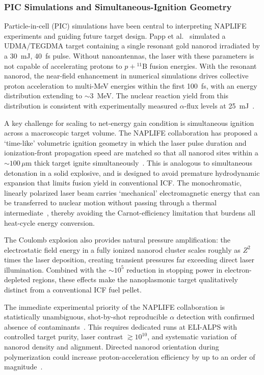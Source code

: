 \documentclass[particles,article,accept,pdftex,moreauthors]{Definitions/mdpi}
\begin{document}
\subsubsection{PIC Simulations and Simultaneous-Ignition Geometry}\label{sssec:NAPLIFE_PIC}
Particle-in-cell (PIC) simulations have been central to interpreting NAPLIFE experiments and guiding future target design. Papp et al.~\cite{Papp:2023arXiv} simulated a UDMA/TEGDMA target containing a single resonant gold nanorod irradiated by a 30~mJ, 40~fs pulse. Without nanoantennas, the laser with these parameters is not capable of accelerating protons to $p+{}^{11}$B fusion energies. With the resonant nanorod, the near-field enhancement in numerical simulations drives collective proton acceleration to multi-MeV energies within the first 100~fs, with an energy distribution extending to $\sim$3~MeV. The nuclear reaction yield from this distribution is consistent with experimentally measured $\alpha$-flux levels at 25~mJ~\cite{Kroo2024pB}.

A key challenge for scaling to net-energy gain condition is simultaneous ignition across a macroscopic target volume. The NAPLIFE collaboration has proposed a `time-like' volumetric ignition geometry in which the laser pulse duration and ionization-front propagation speed are matched so that all nanorod sites within a ${\sim}100\,\mu$m thick target ignite simultaneously~\cite{Csernai:2025EPJ,Biro:2025EPJ}. This is analogous to simultaneous detonation in a solid explosive, and is designed to avoid premature hydrodynamic expansion that limits fusion yield in conventional ICF. The monochromatic, linearly polarized laser beam carries `mechanical' electromagnetic energy that can be transferred to nuclear motion without passing through a thermal intermediate~\cite{Csernai:2025EPJ}, thereby avoiding the Carnot-efficiency limitation that burdens all heat-cycle energy conversion.

The Coulomb explosion also provides natural pressure amplification: the electrostatic field energy in a fully ionized nanorod cluster scales roughly as $Z^2$ times the laser deposition, creating transient pressures far exceeding direct laser illumination. Combined with the ${\sim}10^5$ reduction in stopping power in electron-depleted regions, these effects make the nanoplasmonic target qualitatively distinct from a conventional ICF fuel pellet.

The immediate experimental priority of the NAPLIFE collaboration is statistically unambiguous, shot-by-shot reproducible $\alpha$ detection with confirmed absence of contaminants~\cite{mcnamee2025contaminant}. This requires dedicated runs at ELI-ALPS with controlled target purity, laser contrast $\gtrsim 10^{10}$, and systematic variation of nanorod density and alignment. Directed nanorod orientation during polymerization could increase proton-acceleration efficiency by up to an order of magnitude~\cite{Kedves:2025EPJ}.
\end{document}
